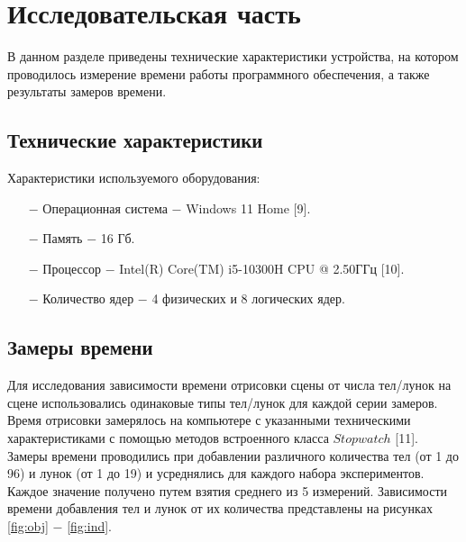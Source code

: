 \chapter{Исследовательская часть}
В данном разделе приведены технические характеристики устройства, на котором проводилось измерение времени работы программного обеспечения, а также результаты замеров времени.

\section{Технические характеристики}
Характеристики используемого оборудования:
\begin{itemize}
    \item[$-$] Операционная система $-$ Windows 11 Home [9].
    \item[$-$] Память $-$ 16 Гб.
    \item[$-$] Процессор $-$ Intel(R) Core(TM) i5-10300H CPU @ 2.50ГГц [10].
    \item[$-$] Количество ядер $-$ 4 физических и 8 логических ядер.
\end{itemize}

\section{Замеры времени}
Для исследования зависимости времени отрисовки сцены от числа тел/лунок на сцене использовались одинаковые типы тел/лунок для каждой серии замеров. Время отрисовки замерялось на компьютере с указанными техническими характеристиками с помощью методов встроенного класса $Stopwatch$ [11]. Замеры времени проводились при добавлении различного количества тел (от 1 до 96) и лунок (от 1 до 19) и усреднялись для каждого набора экспериментов. Каждое значение получено путем взятия среднего из 5 измерений. Зависимости времени добавления тел и лунок от их количества представлены на рисунках \ref{fig:obj} $-$ \ref{fig:ind}.


